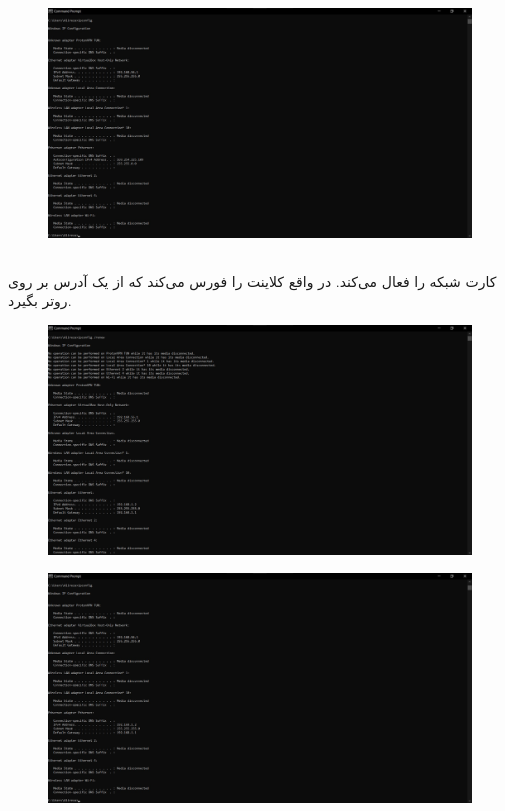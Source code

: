 \documentclass{article}
\begin{document}
\begin{figure}[H]
    \centering
    \includegraphics[width=1.0\textwidth]{figures/3.5.2.jpg}
    \caption
	{
	}
    \label{fig:fig1}
\end{figure}

\subsection{}
 کارت شبکه را فعال می‌کند. در واقع کلاینت را فورس می‌کند که از  یک آدرس  بر روی روتر بگیرد.
\begin{figure}[H]
    \centering
    \includegraphics[width=1.0\textwidth]{figures/3.6.1.jpg}
    \caption
	{
	}
    \label{fig:fig1}
\end{figure}

\begin{figure}[H]
    \centering
    \includegraphics[width=1.0\textwidth]{figures/3.6.2.jpg}
    \caption
	{
	}
    \label{fig:fig1}
\end{figure}
\end{document}
